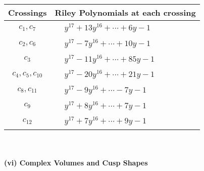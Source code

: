 \documentclass[1p]{elsarticle_modified}
\theoremstyle{definition}
\begin{document}
\begin{tabular}{m{50pt}|m{274pt}}
Crossings & \hspace{64pt}Riley Polynomials at each crossing \\
\hline $$\begin{aligned}c_{1},c_{7}\end{aligned}$$&$\begin{aligned}
&y^{17}+13 y^{16}+\cdots+6 y-1
\end{aligned}$\\
\hline $$\begin{aligned}c_{2},c_{6}\end{aligned}$$&$\begin{aligned}
&y^{17}-7 y^{16}+\cdots+10 y-1
\end{aligned}$\\
\hline $$\begin{aligned}c_{3}\end{aligned}$$&$\begin{aligned}
&y^{17}-11 y^{16}+\cdots+85 y-1
\end{aligned}$\\
\hline $$\begin{aligned}c_{4},c_{5},c_{10}\end{aligned}$$&$\begin{aligned}
&y^{17}-20 y^{16}+\cdots+21 y-1
\end{aligned}$\\
\hline $$\begin{aligned}c_{8},c_{11}\end{aligned}$$&$\begin{aligned}
&y^{17}-9 y^{16}+\cdots-7 y-1
\end{aligned}$\\
\hline $$\begin{aligned}c_{9}\end{aligned}$$&$\begin{aligned}
&y^{17}+8 y^{16}+\cdots+7 y-1
\end{aligned}$\\
\hline $$\begin{aligned}c_{12}\end{aligned}$$&$\begin{aligned}
&y^{17}+7 y^{16}+\cdots+9 y-1
\end{aligned}$\\
\hline
\end{tabular}\\~\\
\newpage\flushleft \textbf{(vi) Complex Volumes and Cusp Shapes}
\end{document}
